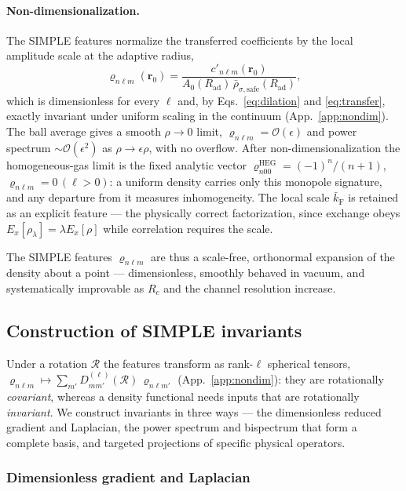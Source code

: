 \documentclass[aps,prb,reprint,superscriptaddress,nofootinbib]{revtex4-2}
\newcommand{\rr}{\mathbf{r}}
\newcommand{\kF}{k_{\mathrm{F}}}
\newcommand{\Rad}{R_{\mathrm{ad}}}
\newcommand{\Rc}{R_{c}}
\begin{document}
\paragraph*{Non-dimensionalization.}
\label{sec:nondim}
The SIMPLE features normalize the transferred coefficients by the local amplitude
scale at the adaptive radius,
\begin{equation}
\label{eq:dnlm}
\varrho_{n\ell m}(\rr_0)=\frac{c'_{n\ell m}(\rr_0)}
{A_0(\Rad)\,\bar\rho_{\sigma,\mathrm{safe}}(\Rad)} ,
\end{equation}
which is dimensionless for every $\ell$ and, by Eqs.~\eqref{eq:dilation} and
\eqref{eq:transfer}, exactly invariant under uniform scaling in the continuum
(App.~\ref{app:nondim}). The ball average gives a smooth $\rho\to0$ limit,
$\varrho_{n\ell m}=\mathcal O(\epsilon)$ and power spectrum $\sim\mathcal O(\epsilon^2)$
as $\rho\to\epsilon\rho$, with no overflow. After non-dimensionalization the
homogeneous-gas limit is the fixed analytic vector
$\varrho^{\mathrm{HEG}}_{n00}=(-1)^n/(n+1)$, $\varrho_{n\ell m}=0\,(\ell>0)$: a uniform
density carries only this monopole signature, and any departure from it measures
inhomogeneity. The local scale $\bar\kF$ is retained as an explicit feature --- the
physically correct factorization, since exchange obeys
$E_x[\rho_\lambda]=\lambda E_x[\rho]$ while correlation requires the scale.

The SIMPLE features $\varrho_{n\ell m}$ are thus a scale-free, orthonormal expansion
of the density about a point --- dimensionless, smoothly behaved in vacuum, and
systematically improvable as $\Rc$ and the channel resolution increase.

\subsection{Construction of SIMPLE invariants}
\label{sec:invariants}

Under a rotation $\mathcal R$ the features transform as rank-$\ell$ spherical
tensors, $\varrho_{n\ell m}\mapsto\sum_{m'}D^{(\ell)}_{mm'}(\mathcal R)\,\varrho_{n\ell m'}$
(App.~\ref{app:nondim}): they are rotationally \emph{covariant}, whereas a density
functional needs inputs that are rotationally \emph{invariant}. We construct
invariants in three ways --- the dimensionless reduced gradient and Laplacian, the
power spectrum and bispectrum that form a complete basis, and targeted projections of
specific physical operators.

\subsubsection{Dimensionless gradient and Laplacian}
\label{sec:gea}
\end{document}
